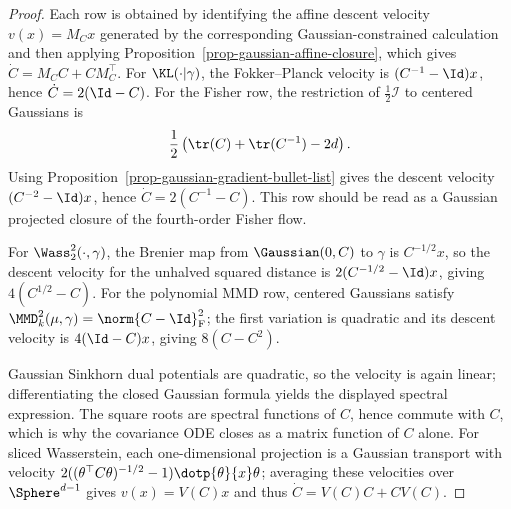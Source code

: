 \begin{proof}
	Each row is obtained by identifying the affine descent velocity $v(x)=M_Cx$ generated by the corresponding Gaussian-constrained calculation and then applying Proposition~\ref{prop-gaussian-affine-closure}, which gives $\dot C=M_CC+CM_C^\top$. For $\KL(\cdot|\gamma)$, the Fokker--Planck velocity is $(C^{-1}-\Id)x$, hence $\dot C=2(\Id-C)$. For the Fisher row, the restriction of $\frac12\mathcal I$ to centered Gaussians is
	\[
		\frac12\left(\tr(C)+\tr(C^{-1})-2d\right).
	\]
	Using Proposition~\ref{prop-gaussian-gradient-bullet-list} gives the descent velocity $(C^{-2}-\Id)x$, hence $\dot C=2(C^{-1}-C)$. This row should be read as a Gaussian projected closure of the fourth-order Fisher flow.

	For $\Wass_2^2(\cdot,\gamma)$, the Brenier map from $\Gaussian(0,C)$ to $\gamma$ is $C^{-1/2}x$, so the descent velocity for the unhalved squared distance is $2(C^{-1/2}-\Id)x$, giving $4(C^{1/2}-C)$. For the polynomial MMD row, centered Gaussians satisfy $\MMD_k^2(\mu,\gamma)=\norm{C-\Id}_{\mathrm F}^2$; the first variation is quadratic and its descent velocity is $4(\Id-C)x$, giving $8(C-C^2)$.

	Gaussian Sinkhorn dual potentials are quadratic, so the velocity is again linear; differentiating the closed Gaussian formula yields the displayed spectral expression. The square roots are spectral functions of $C$, hence commute with $C$, which is why the covariance ODE closes as a matrix function of $C$ alone. For sliced Wasserstein, each one-dimensional projection is a Gaussian transport with velocity $2((\theta^\top C\theta)^{-1/2}-1)\dotp{\theta}{x}\theta$; averaging these velocities over $\Sphere^{d-1}$ gives $v(x)=V(C)x$ and thus $\dot C=V(C)C+CV(C)$.
\end{proof}

